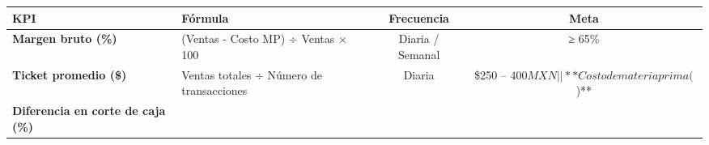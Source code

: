 \documentclass[
  12pt,
  spanish,
]{article}
\begin{document}
\begin{longtable}[]{@{}llcc@{}}
\toprule
\begin{minipage}[b]{0.17\columnwidth}\raggedright
KPI\strut
\end{minipage} & \begin{minipage}[b]{0.17\columnwidth}\raggedright
Fórmula\strut
\end{minipage} & \begin{minipage}[b]{0.28\columnwidth}\centering
Frecuencia\strut
\end{minipage} & \begin{minipage}[b]{0.28\columnwidth}\centering
Meta\strut
\end{minipage}\tabularnewline
\midrule
\endhead
\begin{minipage}[t]{0.17\columnwidth}\raggedright
\textbf{Margen bruto (\%)}\strut
\end{minipage} & \begin{minipage}[t]{0.17\columnwidth}\raggedright
(Ventas - Costo MP) ÷ Ventas × 100\strut
\end{minipage} & \begin{minipage}[t]{0.28\columnwidth}\centering
Diaria / Semanal\strut
\end{minipage} & \begin{minipage}[t]{0.28\columnwidth}\centering
≥ 65\%\strut
\end{minipage}\tabularnewline
\begin{minipage}[t]{0.17\columnwidth}\raggedright
\textbf{Ticket promedio (\$)}\strut
\end{minipage} & \begin{minipage}[t]{0.17\columnwidth}\raggedright
Ventas totales ÷ Número de transacciones\strut
\end{minipage} & \begin{minipage}[t]{0.28\columnwidth}\centering
Diaria\strut
\end{minipage} & \begin{minipage}[t]{0.28\columnwidth}\centering
\$250 --
\(400 MXN | | **Costo de materia prima (%
\))**\strut
\end{minipage}\tabularnewline
\begin{minipage}[t]{0.17\columnwidth}\raggedright
\textbf{Diferencia en corte de caja (\%)}\strut
\end{minipage} & \begin{minipage}[t]{0.17\columnwidth}\raggedright

\end{minipage}
\end{longtable}
\end{document}
